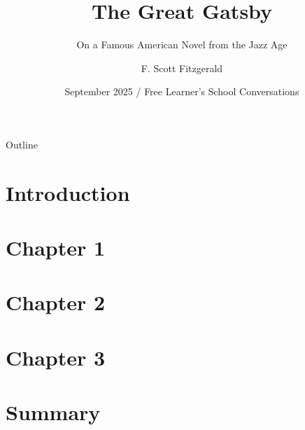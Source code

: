 \documentclass{beamer}
\title[The Great Gatsby] %
{The Great Gatsby}
\subtitle
{On a Famous American Novel from the Jazz Age} %
\author[FSF,KM] %
{F. Scott Fitzgerald\inst{1}}
\institute[Unknown] %
{
  \inst{1}%
  Original Author
}
\date[September 2025] %
{September 2025 / Free Learner's School Conversations}
\begin{document}
\begin{frame}
  \titlepage
\end{frame}

\begin{frame}{Outline}
  \tableofcontents
\end{frame}




\section{Introduction}

\section{Chapter 1}






\section{Chapter 2}

\section{Chapter 3}



\section{Summary}
\end{document}
